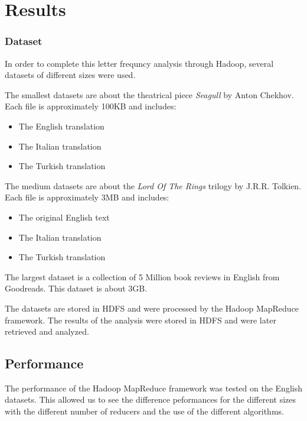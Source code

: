 \chapter{Results}

\subsection{Dataset}
In order to complete this letter frequncy analysis through Hadoop, several datasets of different sizes were used. 

The smallest datasets are about the theatrical piece \textit{Seagull} by Anton Chekhov. Each file is approximately 100KB and includes: 
\begin{itemize}
    \item The English translation
    \item The Italian translation
    \item The Turkish translation
\end{itemize}

The medium datasets are about the \textit{Lord Of The Rings} trilogy by J.R.R. Tolkien. Each file is approximately 3MB and includes: 
\begin{itemize}
    \item The original English text
    \item The Italian translation
    \item The Turkish translation
\end{itemize}

The largest dataset is a collection of 5 Million book reviews in English from Goodreads. This dataset is about 3GB. 
 
The datasets are stored in HDFS and were processed by the Hadoop MapReduce framework. The results of the analysis were stored in HDFS and were later retrieved and analyzed.
\newpage
\section{Performance}
The performance of the Hadoop MapReduce framework was tested on the English datasets. This allowed us to see the difference peformances for the different
sizes with the different number of reducers and the use of the different algorithms. \\

